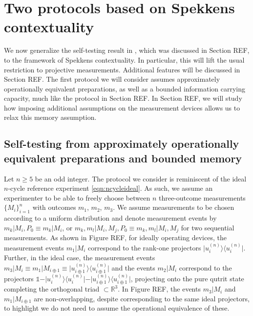 \chapter{Two protocols based on Spekkens contextuality}
\label{sec:protocols}
We now generalize the self-testing result in \cite{Bharti2019}, which was discussed in Section REF, to the framework of Spekkens contextuality. In particular, this will lift the usual restriction to projective measurements. Additional features will be discussed in Section REF. The first protocol we will consider assumes approximately operationally equivalent preparations, as well as a bounded information carrying capacity, much like the protocol in Section REF. In Section REF, we will study how imposing additional assumptions on the measurement devices allows us to relax this memory assumption.
\section{Self-testing from approximately operationally equivalent preparations and bounded memory}
Let $n\geq 5$ be an odd integer. The protocol we consider is reminiscent of the ideal $n$-cycle reference experiment \ref{eqn:ncycleideal}. As such, we assume an experimenter to be able to freely choose between $n$ three-outcome measurements $\{M_i\}_{i=1}^n$ with outcomes $m_1$, $m_2$, $m_3$. We assume measurements to be chosen according to a uniform distribution and denote measurement events by $m_k\vert M_i,P_0 \equiv m_k\vert M_i$, or $m_k,m_l\vert M_i,M_j, P_0 \equiv m_k,m_l\vert M_i,M_j$ for two sequential measurements. As shown in Figure REF, for ideally operating devices, the measurement events $m_1 \vert M_i$ correspond to the rank-one projectors $\vert u_i^{(n)}\rangle\langle u_i^{(n)}\vert$. Further, in the ideal case, the measurement events $m_3\vert M_i\equiv m_1\vert M_{i\oplus 1}\equiv\vert u_{i\oplus 1}^{(n)}\rangle\langle u_{i\oplus 1}^{(n)}\vert$ and the events $m_2\vert M_i$ correspond to the projectors $\mathbb{1}-\vert u_i^{(n)}\rangle\langle u_i^{(n)}\vert-\vert u_{i\oplus 1}^{(n)}\rangle\langle u_{i\oplus 1}^{(n)}\vert$, projecting onto the pure qutrit state completing the orthogonal triad $\subset \mathbb{R}^3$. In Figure REF, the events $m_3 \vert M_i$ and $m_1\vert M_{i\oplus 1}$ are non-overlapping, despite corresponding to the same ideal projectors, to highlight we do not need to assume the operational equivalence of these.

